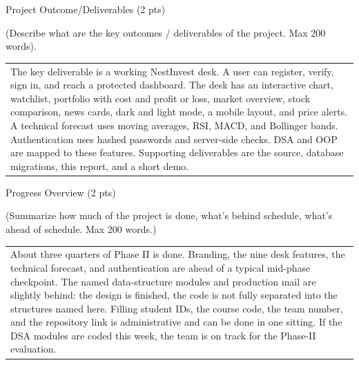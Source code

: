 \documentclass[12pt,a4paper]{article}
\newcommand{\sectiontitle}[1]{%
    {\color{GEUBlue}
    \fontsize{18}{22}\selectfont #1}
}
\newcommand{\instruction}[1]{%
    {\color{InstructionGrey}
    \fontsize{10.5}{13}\selectfont #1}
}
\newcommand{\answerbox}[2]{%
    \begin{tabularx}{\textwidth}{
        |>{\raggedright\arraybackslash}X|}
        \hline
        \parbox[t][#1][t]{\dimexpr\linewidth-12pt\relax}{
            \vspace{5pt}
            \fontsize{11}{13}\selectfont #2
        }\\
        \hline
    \end{tabularx}
}
\begin{document}
\newpage


\vspace*{0.30cm}

\sectiontitle{Project Outcome/Deliverables (2 pts)}

\vspace{0.05cm}

\instruction{
(Describe what are the key outcomes / deliverables of the project.
Max 200 words).
}

\vspace{0.35cm}

\answerbox{3.35cm}{The key deliverable is a working NestInvest desk. A user can register, verify, sign in, and reach a protected dashboard. The desk has an interactive chart, watchlist, portfolio with cost and profit or loss, market overview, stock comparison, news cards, dark and light mode, a mobile layout, and price alerts. A technical forecast uses moving averages, RSI, MACD, and Bollinger bands. Authentication uses hashed passwords and server-side checks. DSA and OOP are mapped to these features. Supporting deliverables are the source, database migrations, this report, and a short demo.}

\vspace{0.75cm}

\sectiontitle{Progress Overview (2 pts)}

\vspace{0.05cm}

\instruction{
(Summarize how much of the project is done, what's behind schedule,
what's ahead of schedule. Max 200 words.)
}

\vspace{0.25cm}

\answerbox{4.45cm}{About three quarters of Phase II is done. Branding, the nine desk features, the technical forecast, and authentication are ahead of a typical mid-phase checkpoint. The named data-structure modules and production mail are slightly behind: the design is finished, the code is not fully separated into the structures named here. Filling student IDs, the course code, the team number, and the repository link is administrative and can be done in one sitting. If the DSA modules are coded this week, the team is on track for the Phase-II evaluation.}

\newpage
\end{document}
